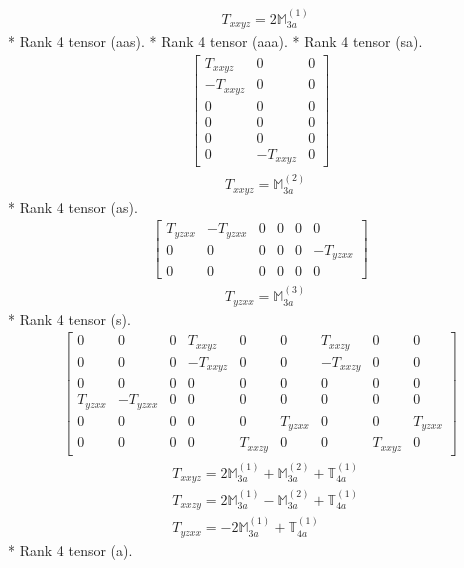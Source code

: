 \documentclass[fleqn,8pt,landscape]{jsarticle}
\begin{document}
\begin{align*}
& T_{xxyz} = 2 \mathbb{M}_{3a}^{(1)}
\end{align*}
* Rank 4 tensor (aas).
* Rank 4 tensor (aaa).
* Rank 4 tensor (sa).
\begin{align*}
\begin{bmatrix} T_{xxyz} & 0 & 0 \\ - T_{xxyz} & 0 & 0 \\ 0 & 0 & 0 \\ 0 & 0 & 0 \\ 0 & 0 & 0 \\ 0 & - T_{xxyz} & 0 \end{bmatrix}
\end{align*}
\begin{align*}
& T_{xxyz} = \mathbb{M}_{3a}^{(2)}
\end{align*}
* Rank 4 tensor (as).
\begin{align*}
\begin{bmatrix} T_{yzxx} & - T_{yzxx} & 0 & 0 & 0 & 0 \\ 0 & 0 & 0 & 0 & 0 & - T_{yzxx} \\ 0 & 0 & 0 & 0 & 0 & 0 \end{bmatrix}
\end{align*}
\begin{align*}
& T_{yzxx} = \mathbb{M}_{3a}^{(3)}
\end{align*}
* Rank 4 tensor (s).
\begin{align*}
\begin{bmatrix} 0 & 0 & 0 & T_{xxyz} & 0 & 0 & T_{xxzy} & 0 & 0 \\ 0 & 0 & 0 & - T_{xxyz} & 0 & 0 & - T_{xxzy} & 0 & 0 \\ 0 & 0 & 0 & 0 & 0 & 0 & 0 & 0 & 0 \\ T_{yzxx} & - T_{yzxx} & 0 & 0 & 0 & 0 & 0 & 0 & 0 \\ 0 & 0 & 0 & 0 & 0 & T_{yzxx} & 0 & 0 & T_{yzxx} \\ 0 & 0 & 0 & 0 & T_{xxzy} & 0 & 0 & T_{xxyz} & 0 \end{bmatrix}
\end{align*}
\begin{align*}
& T_{xxyz} = 2 \mathbb{M}_{3a}^{(1)} + \mathbb{M}_{3a}^{(2)} + \mathbb{T}_{4a}^{(1)} \\
& T_{xxzy} = 2 \mathbb{M}_{3a}^{(1)} - \mathbb{M}_{3a}^{(2)} + \mathbb{T}_{4a}^{(1)} \\
& T_{yzxx} = - 2 \mathbb{M}_{3a}^{(1)} + \mathbb{T}_{4a}^{(1)}
\end{align*}
* Rank 4 tensor (a).
\end{document}
